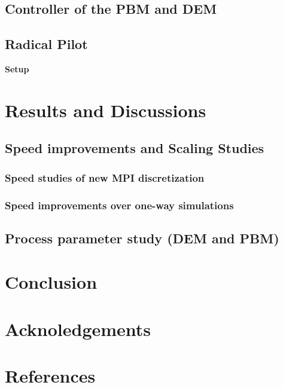 \documentclass[preprint,11pt,authoryear]{elsarticle}
\begin{document}
\subsection{Controller of the PBM and DEM}

\subsection{Radical Pilot}

\textbf{{Setup}}


\section{Results and Discussions}

\subsection{Speed improvements and Scaling Studies}

\subsubsection{Speed studies of new MPI discretization}

\subsubsection{Speed improvements over one-way simulations}

\subsection{Process parameter study (DEM and PBM)}

\section{Conclusion}

\section{Acknoledgements}

\section*{References}

%

\end{document}
